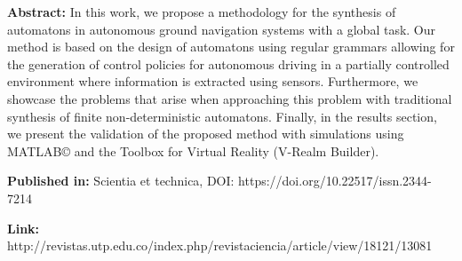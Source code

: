 \documentclass[11pt,a4paper,sans,english]{moderncv}        %
\begin{document}
\begin{enumerate}
    \textbf{Abstract:} In this work, we propose a methodology for the synthesis of automatons in autonomous ground navigation systems with a global task. Our method is based on the design of automatons using regular grammars allowing for the generation of control policies for autonomous driving in a partially controlled environment where information is extracted using sensors. Furthermore, we showcase the problems that arise when approaching this problem with traditional synthesis of finite non-deterministic automatons. Finally, in the results section, we present the validation of the proposed method with simulations using MATLAB© and the Toolbox for Virtual Reality (V-Realm Builder).
    
    \textbf{Published in:} Scientia et technica, DOI: https://doi.org/10.22517/issn.2344-7214
    
    \textbf{Link:} http://revistas.utp.edu.co/index.php/revistaciencia/article/view/18121/13081
\end{enumerate}
\makeletterclosing
\end{document}
